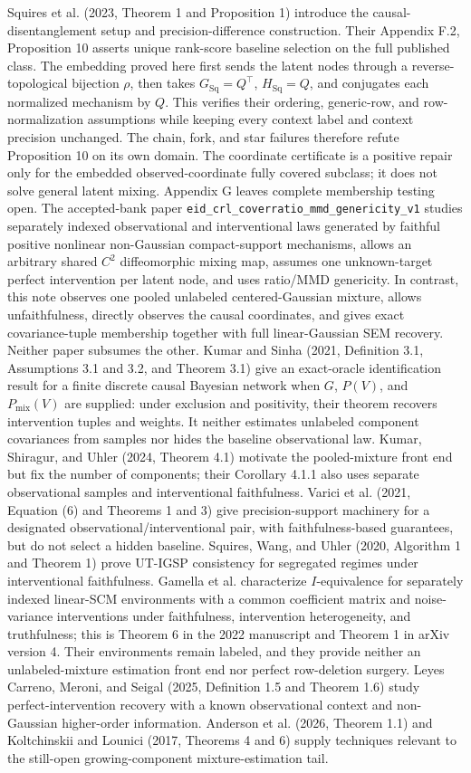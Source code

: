 \documentclass{article}
\begin{document}
Squires et al. (2023, Theorem 1 and Proposition 1) introduce the causal-disentanglement setup and precision-difference construction. Their Appendix F.2, Proposition 10 asserts unique rank-score baseline selection on the full published class. The embedding proved here first sends the latent nodes through a reverse-topological bijection \(\rho\), then takes \(G_{\mathrm{Sq}}=Q^{\top}\), \(H_{\mathrm{Sq}}=Q\), and conjugates each normalized mechanism by \(Q\). This verifies their ordering, generic-row, and row-normalization assumptions while keeping every context label and context precision unchanged. The chain, fork, and star failures therefore refute Proposition 10 on its own domain. The coordinate certificate is a positive repair only for the embedded observed-coordinate fully covered subclass; it does not solve general latent mixing. Appendix G leaves complete membership testing open. The accepted-bank paper \texttt{eid\_crl\_coverratio\_mmd\_genericity\_v1} studies separately indexed observational and interventional laws generated by faithful positive nonlinear non-Gaussian compact-support mechanisms, allows an arbitrary shared \(C^2\) diffeomorphic mixing map, assumes one unknown-target perfect intervention per latent node, and uses ratio/MMD genericity. In contrast, this note observes one pooled unlabeled centered-Gaussian mixture, allows unfaithfulness, directly observes the causal coordinates, and gives exact covariance-tuple membership together with full linear-Gaussian SEM recovery. Neither paper subsumes the other. Kumar and Sinha (2021, Definition 3.1, Assumptions 3.1 and 3.2, and Theorem 3.1) give an exact-oracle identification result for a finite discrete causal Bayesian network when \(G\), \(P(V)\), and \(P_{\mathrm{mix}}(V)\) are supplied: under exclusion and positivity, their theorem recovers intervention tuples and weights. It neither estimates unlabeled component covariances from samples nor hides the baseline observational law. Kumar, Shiragur, and Uhler (2024, Theorem 4.1) motivate the pooled-mixture front end but fix the number of components; their Corollary 4.1.1 also uses separate observational samples and interventional faithfulness. Varici et al. (2021, Equation (6) and Theorems 1 and 3) give precision-support machinery for a designated observational/interventional pair, with faithfulness-based guarantees, but do not select a hidden baseline. Squires, Wang, and Uhler (2020, Algorithm 1 and Theorem 1) prove UT-IGSP consistency for segregated regimes under interventional faithfulness. Gamella et al. characterize \(I\)-equivalence for separately indexed linear-SCM environments with a common coefficient matrix and noise-variance interventions under faithfulness, intervention heterogeneity, and truthfulness; this is Theorem 6 in the 2022 manuscript and Theorem 1 in arXiv version 4. Their environments remain labeled, and they provide neither an unlabeled-mixture estimation front end nor perfect row-deletion surgery. Leyes Carreno, Meroni, and Seigal (2025, Definition 1.5 and Theorem 1.6) study perfect-intervention recovery with a known observational context and non-Gaussian higher-order information. Anderson et al. (2026, Theorem 1.1) and Koltchinskii and Lounici (2017, Theorems 4 and 6) supply techniques relevant to the still-open growing-component mixture-estimation tail.
\end{document}
